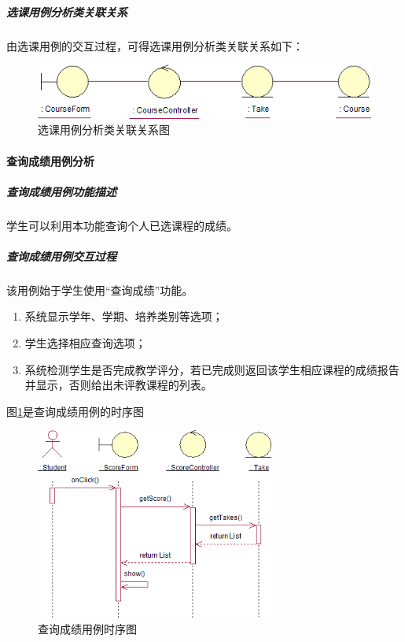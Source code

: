 \subparagraph{选课用例分析类关联关系}
由选课用例的交互过程，可得选课用例分析类关联关系如下：
\begin{figure}[H]
  \centering
  \includegraphics[width=\textwidth]{img/selectcourse_depend}
  \caption{选课用例分析类关联关系图}
\end{figure}
  
\paragraph{查询成绩用例分析}
\subparagraph{查询成绩用例功能描述}

学生可以利用本功能查询个人已选课程的成绩。
    
\subparagraph{查询成绩用例交互过程}
    
该用例始于学生使用“查询成绩”功能。
\begin{enumerate}
  \item 系统显示学年、学期、培养类别等选项；
  \item 学生选择相应查询选项；
  \item 系统检测学生是否完成教学评分，若已完成则返回该学生相应课程的成绩报告并显示，否则给出未评教课程的列表。
\end{enumerate}
    
图\ref{fig:query_achievement_sequence}是查询成绩用例的时序图
\begin{figure}
  \centering
  \includegraphics[width=0.7\textwidth]{img/query_achievement_sequence}
  \caption{查询成绩用例时序图}
  \label{fig:query_achievement_sequence}
\end{figure}
    
